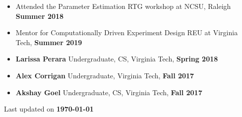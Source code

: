 \documentclass[10pt,a4paper,ragged2e]{altacv}
\begin{document}
\begin{itemize}
\item Attended the Parameter Estimation RTG workshop at NCSU, Raleigh \textbf{Summer 2018}
\end{itemize}

\begin{itemize}
  \item Mentor for Computationally Driven Experiment Design REU at Virginia Tech, \textbf{Summer 2019}
  \item \textbf{Larissa Perara} Undergraduate, CS, Virginia Tech,   \textbf{Spring 2018}
  \item \textbf{Alex Corrigan} Undergraduate, Virginia Tech,  \textbf{Fall 2017}    
  \item \textbf{Akshay Goel} Undergraduate, CS, Virginia Tech,  \textbf{Fall 2017}
\end{itemize}
\nocite{*}







\vfill
\begin{center}
Last updated on \textbf{\today}  
\end{center}

\end{document}
